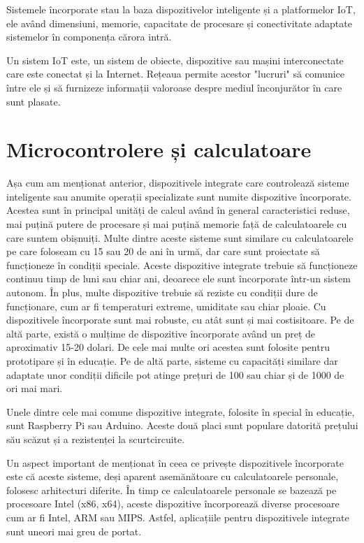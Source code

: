 Sistemele încorporate stau la baza dispozitivelor inteligente și a platformelor
IoT, ele având dimensiuni, memorie, capacitate de procesare și conectivitate
adaptate sistemelor în componența cărora intră.

Un sistem IoT este, un sistem de obiecte, dispozitive sau mașini interconectate
care este conectat și la Internet. Rețeaua permite acestor "lucruri" să comunice
între ele și să furnizeze informații valoroase despre mediul înconjurător în
care sunt plasate.

\section{Microcontrolere și calculatoare}
\label{sec:embed-ics}

Așa cum am menționat anterior, dispozitivele integrate care controlează sisteme
inteligente sau anumite operații specializate sunt numite dispozitive
încorporate. Acestea sunt în principal unități de calcul având în general
caracteristici reduse, mai puțină putere de procesare și mai puțină memorie față
de calculatoarele cu care suntem obișnuiți. Multe dintre aceste sisteme sunt
similare cu calculatoarele pe care foloseam cu 15 sau 20 de ani în urmă, dar
care sunt proiectate să funcționeze în condiții speciale. Aceste dispozitive
integrate trebuie să funcționeze continuu timp de luni sau chiar ani, deoarece
ele sunt încorporate într-un sistem autonom. În plus, multe dispozitive trebuie
să reziste cu condiții dure de funcționare, cum ar fi temperaturi extreme,
umiditate sau chiar ploaie. Cu dispozitivele încorporate sunt mai robuste, cu
atât sunt și mai costisitoare. Pe de altă parte, există o mulțime de dispozitive
încorporate având un preț de aproximativ 15-20 dolari. De cele mai multe ori
acestea sunt folosite pentru prototipare și în educație. Pe de altă parte,
sisteme cu capacități similare dar adaptate unor condiții dificile pot atinge
prețuri de 100 sau chiar și de 1000 de ori mai mari.

Unele dintre cele mai comune dispozitive integrate, folosite în special în
educație, sunt Raspberry Pi sau Arduino. Aceste două placi sunt populare
datorită prețului său scăzut și a rezistenței la scurtcircuite.

Un aspect important de menționat în ceea ce privește dispozitivele încorporate
este că aceste sisteme, deși aparent asemănătoare cu calculatoarele personale,
folosesc arhitecturi diferite. În timp ce calculatoarele personale se bazează pe
procesoare Intel (x86, x64), aceste dispozitive încorporează diverse procesoare
cum ar fi Intel, ARM sau MIPS. Astfel, aplicațiile pentru dispozitivele
integrate sunt uneori mai greu de portat.

